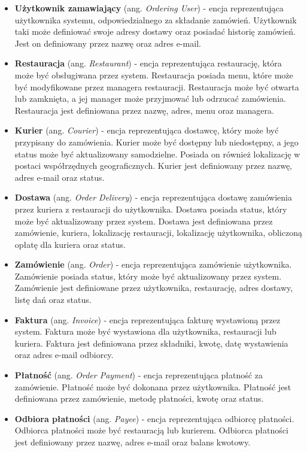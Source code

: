 \begin{itemize}

    \item \textbf{Użytkownik zamawiający} (ang. \textit{Ordering User}) - encja reprezentująca użytkownika systemu, odpowiedzialnego za składanie zamówień. Użytkownik taki może definiować swoje adresy dostawy oraz posiadać historię zamówień. Jest on definiowany przez nazwę oraz adres e-mail.
    \item \textbf{Restauracja} (ang. \textit{Restaurant}) - encja reprezentująca restaurację, która może być obsługiwana przez system. Restauracja posiada menu, które może być modyfikowane przez managera restauracji. Restauracja może być otwarta lub zamknięta, a jej manager może przyjmować lub odrzucać zamówienia. Restauracja jest definiowana przez nazwę, adres, menu oraz managera.
    \item \textbf{Kurier} (ang. \textit{Courier}) - encja reprezentująca dostawcę, który może być przypisany do zamówienia. Kurier może być dostępny lub niedostępny, a jego status może być aktualizowany samodzielne. Posiada on również lokalizację w postaci współrzędnych geograficznych. Kurier jest definiowany przez nazwę, adres e-mail oraz status.
    \item \textbf{Dostawa} (ang. \textit{Order Delivery}) - encja reprezentująca dostawę zamówienia przez kuriera z restauracji do użytkownika. Dostawa posiada status, który może być aktualizowany przez system. Dostawa jest definiowana przez zamówienie, kuriera, lokalizację restauracji, lokalizację użytkownika, obliczoną opłatę dla kuriera oraz status.
    \item \textbf{Zamówienie} (ang. \textit{Order}) - encja reprezentująca zamówienie użytkownika. Zamówienie posiada status, który może być aktualizowany przez system. Zamówienie jest definiowane przez użytkownika, restaurację, adres dostawy, listę dań oraz status.
    \item \textbf{Faktura} (ang. \textit{Invoice}) - encja reprezentująca fakturę wystawioną przez system. Faktura może być wystawiona dla użytkownika, restauracji lub kuriera. Faktura jest definiowana przez składniki, kwotę, datę wystawienia oraz adres e-mail odbiorcy.
    \item \textbf{Płatność} (ang. \textit{Order Payment}) - encja reprezentująca płatność za zamówienie. Płatność może być dokonana przez użytkownika. Płatność jest definiowana przez zamówienie, metodę płatności, kwotę oraz status.
    \item \textbf{Odbiora płatności} (ang. \textit{Payee}) - encja reprezentująca odbiorcę płatności. Odbiorca płatności może być restauracją lub kurierem. Odbiorca płatności jest definiowany przez nazwę, adres e-mail oraz balans kwotowy.

\end{itemize}
